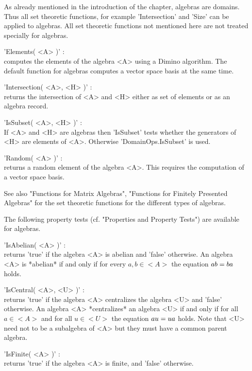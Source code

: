 As already mentioned in the introduction of the chapter, algebras are
domains. Thus all set theoretic functions, for example 'Intersection'
and 'Size' can be applied to algebras.
All set theoretic functions not mentioned here are not treated specially
for algebras.

'Elements( <A> )' : \\
    computes the elements of the algebra <A> using a Dimino algorithm.
    The default function for algebras computes a vector space basis at
    the same time.

'Intersection( <A>, <H> )' : \\
    returns the intersection of <A> and <H> either as set of elements
    or as an algebra record.

'IsSubset( <A>, <H> )' : \\
    If <A> and <H> are algebras then 'IsSubset' tests whether the
    generators of <H> are elements of <A>.
    Otherwise 'DomainOps.IsSubset' is used.

'Random( <A> )' : \\
    returns a random element of the algebra <A>.
    This requires the computation of a vector space basis.

See also "Functions for Matrix Algebras", "Functions for Finitely
Presented Algebras" for the set theoretic functions for the different
types of algebras.


The following property tests (cf. "Properties and Property Tests") are
available for algebras.

'IsAbelian( <A> )' : \\
    returns 'true' if the algebra <A> is abelian and 'false' otherwise.
    An algebra <A> is *abelian* if and only if for every $a, b\in <A>$
    the equation $a\* b = b\* a$ holds.

'IsCentral( <A>, <U> )' : \\
    returns 'true' if the algebra <A> centralizes the algebra <U> and
    'false' otherwise.
    An algebra <A> *centralizes* an algebra <U> if and only if for all
    $a\in <A>$ and for all $u\in <U>$ the equation $a\* u = u\* a$ holds.
    Note that <U> need not to be a subalgebra of <A> but they must have
    a common parent algebra.

'IsFinite( <A> )' : \\
    returns 'true' if the algebra <A> is finite, and 'false' otherwise.


